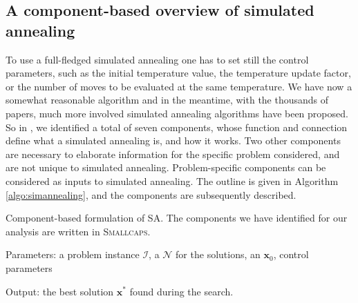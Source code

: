 \subsection{A component-based overview of simulated annealing}
\label{sec:sacomponents}

To use a full-fledged simulated annealing one has to set still 
the control parameters, such as the initial temperature value,
the temperature update factor, or the number of moves to be evaluated at the same temperature.
We have now a somewhat reasonable algorithm and
in the meantime, with the thousands of papers, much more involved 
simulated annealing algorithms have been proposed. So in 
\cite{FraStu2019:cor}, we identified a total 
of seven components, whose function and connection
define what a simulated annealing is, and how it works. Two other components 
are necessary to elaborate information for the specific problem considered,
and are not unique to simulated annealing. Problem-specific components can be considered as 
inputs to simulated annealing.
The outline is given in Algorithm \ref{algo:simannealing}, and the components
are subsequently described.

\begin{algorithm}[ht!]
	  \caption{Component-based formulation of SA. The components we
      have identified for our analysis are written in \textsc{Smallcaps}.}
     \label{algo:simannealing}
    
    Parameters: a problem instance $\mathcal{I}$, a \neighbourhood $\mathcal{N}$ for the solutions, an \initialsolution $\mathbf{x}_0$, control parameters
    
    Output: the best solution $\mathbf{x^*}$ found during the search.
    
	\begin{algorithmic}[1] 
		\ENDIF
		\ENDIF
		\ENDIF
		\ENDWHILE
	\end{algorithmic}
	
\end{algorithm}

